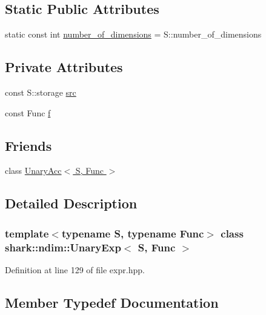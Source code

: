 \subsection*{Static Public Attributes}
\begin{DoxyCompactItemize}
\item 
static const int \hyperlink{classshark_1_1ndim_1_1_unary_exp_a333e05cf6d425d7f42b3f7eb575e6bcb}{number\+\_\+of\+\_\+dimensions} = S\+::number\+\_\+of\+\_\+dimensions
\end{DoxyCompactItemize}
\subsection*{Private Attributes}
\begin{DoxyCompactItemize}
\item 
const S\+::storage \hyperlink{classshark_1_1ndim_1_1_unary_exp_ad43011a53ffbee999334c7cc52fb95ad}{src}
\item 
const Func \hyperlink{classshark_1_1ndim_1_1_unary_exp_a7d3fe16a63fc7e035839407f24b586b9}{f}
\end{DoxyCompactItemize}
\subsection*{Friends}
\begin{DoxyCompactItemize}
\item 
class \hyperlink{classshark_1_1ndim_1_1_unary_exp_a022f283e42a9d39735bdcf5d954349f1}{Unary\+Acc$<$ S, Func $>$}
\end{DoxyCompactItemize}


\subsection{Detailed Description}
\subsubsection*{template$<$typename S, typename Func$>$\newline
class shark\+::ndim\+::\+Unary\+Exp$<$ S, Func $>$}



Definition at line 129 of file expr.\+hpp.



\subsection{Member Typedef Documentation}
\hypertarget{classshark_1_1ndim_1_1_unary_exp_aa34e1f563bfcee209cd2c1886fe7320f}{}\label{classshark_1_1ndim_1_1_unary_exp_aa34e1f563bfcee209cd2c1886fe7320f} 
